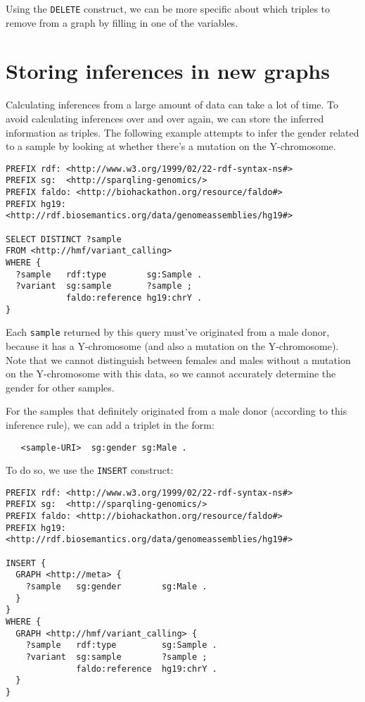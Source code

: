   Using the \texttt{DELETE} construct, we can be more specific about which
  triples to remove from a graph by filling in one of the variables.

\section{Storing inferences in new graphs}
\label{sec:storing-inferences-in-new-graphs}

  Calculating inferences from a large amount of data can take a lot of time.
  To avoid calculating inferences over and over again, we can store the
  inferred information as triples.  The following example attempts to infer
  the gender related to a sample by looking at whether there's a mutation on
  the Y-chromosome.

\begin{siderules}
\begin{verbatim}
PREFIX rdf: <http://www.w3.org/1999/02/22-rdf-syntax-ns#>
PREFIX sg:  <http://sparqling-genomics/>
PREFIX faldo: <http://biohackathon.org/resource/faldo#>
PREFIX hg19:  <http://rdf.biosemantics.org/data/genomeassemblies/hg19#>

SELECT DISTINCT ?sample
FROM <http://hmf/variant_calling>
WHERE {
  ?sample   rdf:type        sg:Sample .
  ?variant  sg:sample       ?sample ;
            faldo:reference hg19:chrY .
}
\end{verbatim}
\end{siderules}

 Each \texttt{sample} returned by this query must've originated from a male
 donor, because it has a Y-chromosome (and also a mutation on the
 Y-chromosome).  Note that we cannot distinguish between females and males
 without a mutation on the Y-chromosome with this data, so we cannot accurately
 determine the gender for other samples.

 For the samples that definitely originated from a male donor (according to
 this inference rule), we can add a triplet in the form:

\begin{siderules}
\begin{verbatim}
   <sample-URI>  sg:gender sg:Male .
\end{verbatim}
\end{siderules}

  To do so, we use the \texttt{INSERT} construct:

\begin{siderules}
\begin{verbatim}
PREFIX rdf: <http://www.w3.org/1999/02/22-rdf-syntax-ns#>
PREFIX sg:  <http://sparqling-genomics/>
PREFIX faldo: <http://biohackathon.org/resource/faldo#>
PREFIX hg19:  <http://rdf.biosemantics.org/data/genomeassemblies/hg19#>

INSERT {
  GRAPH <http://meta> {
    ?sample   sg:gender        sg:Male .
  }
}
WHERE {
  GRAPH <http://hmf/variant_calling> {
    ?sample   rdf:type         sg:Sample .
    ?variant  sg:sample        ?sample ;
              faldo:reference  hg19:chrY .
  }
}
\end{verbatim}
\end{siderules}

